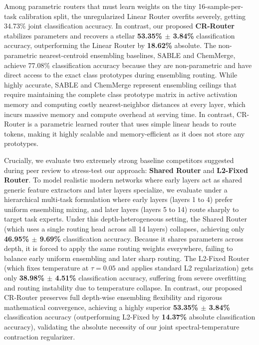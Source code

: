 Among parametric routers that must learn weights on the tiny 16-sample-per-task calibration split, the unregularized Linear Router overfits severely, getting 34.73\% joint classification accuracy. In contrast, our proposed \textbf{CR-Router} stabilizes parameters and recovers a stellar \textbf{53.35\% $\pm$ 3.84\%} classification accuracy, outperforming the Linear Router by \textbf{18.62\%} absolute. The non-parametric nearest-centroid ensembling baselines, SABLE and ChemMerge, achieve 77.08\% classification accuracy because they are non-parametric and have direct access to the exact class prototypes during ensembling routing. While highly accurate, SABLE and ChemMerge represent ensembling ceilings that require maintaining the complete class prototype matrix in active activation memory and computing costly nearest-neighbor distances at every layer, which incurs massive memory and compute overhead at serving time. In contrast, CR-Router is a parametric learned router that uses simple linear heads to route tokens, making it highly scalable and memory-efficient as it does not store any prototypes.

Crucially, we evaluate two extremely strong baseline competitors suggested during peer review to stress-test our approach: \textbf{Shared Router} and \textbf{L2-Fixed Router}. To model realistic modern networks where early layers act as shared generic feature extractors and later layers specialize, we evaluate under a hierarchical multi-task formulation where early layers (layers 1 to 4) prefer uniform ensembling mixing, and later layers (layers 5 to 14) route sharply to target task experts. Under this depth-heterogeneous setting, the Shared Router (which uses a single routing head across all 14 layers) collapses, achieving only \textbf{46.95\% $\pm$ 9.69\%} classification accuracy. Because it shares parameters across depth, it is forced to apply the same routing weights everywhere, failing to balance early uniform ensembling and later sharp routing. The L2-Fixed Router (which fixes temperature at $\tau = 0.05$ and applies standard L2 regularization) gets only \textbf{38.98\% $\pm$ 4.51\%} classification accuracy, suffering from severe overfitting and routing instability due to temperature collapse. In contrast, our proposed CR-Router preserves full depth-wise ensembling flexibility and rigorous mathematical convergence, achieving a highly superior \textbf{53.35\% $\pm$ 3.84\%} classification accuracy (outperforming L2-Fixed by \textbf{14.37\%} absolute classification accuracy), validating the absolute necessity of our joint spectral-temperature contraction regularizer.

